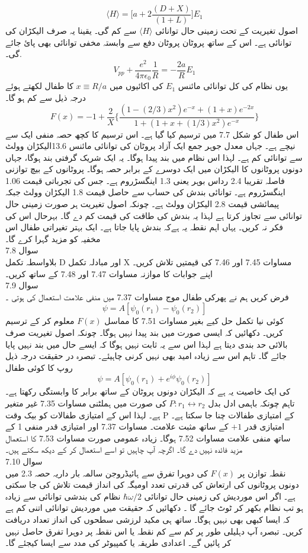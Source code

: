 \[\langle H \rangle =\big[a+2\frac{(D+X)}{(1+L)}\big]E_{1}\]
اصول تغیریت کے تحت زمینی حال توانائی  
\(\langle H \rangle\)
 سے کم گی۔ یقینا  یہ صرف الیکڑان کی توانائی ہے۔ اس کے ساتھ پروٹان پروٹان دفع سے وابستہ مخفی توانائی بھی پائ جائے گی۔.
\[V_{pp}+\frac{e^{2}}{4\pi\epsilon_{0}}\frac{1}{R}=-\frac{2a}{R}E_{1}\]
یوں نظام کی  کل توانائی مائنس
\(E_{1}\)
  کی  اکائیوں میں 
  \(x\equiv R/a\)
  کا طفال لکھتے ہوئے درجہ ذیل سے کم ہو گا۔
  \[F(x)=-1+\frac{2}{X}\big\{\frac{(1-(2/3)x^{2})e^{-x}+(1+x)e^{-2x}}{1+(1+x+(1/3)x^{2})e^{-x}}\big\}\]
اس طفال کو شکل 7.7 میں ترسیم کیا گیا ہے۔ اس ترسیم کا کچھ حصہ منفی ایک سے نیچے ہے۔ جہاں معدل جوہر جمع ایک آزاد پروٹان کی توانائی مائنس  13.6الیکڑان وولٹ سے توانائی کم ہے۔ لہذا اس نظام میں بند پیدا ہوگا۔ یہ ایک شریک گرفتی بند ہوگا، جہاں دونوں پروٹانوں کا الیکڑان میں ایک دوسرے کے برابر حصہ ہوگا۔ پروٹانوں کے بیچ توازنی فاصلہ تقریبا 2.4 رداس بوہر یعنی 1.3 اینگسڑروم ہے۔ جس کی تجرباتی قیمت 1.06 اینگسڑروم ہے۔ توانائی بندش کی حساب سے حاصل قیمت 1.8 الیکڑان وولٹ جبکہ پیمائشی قیمت 2.8 الیکڑان وولٹ ہے۔ چونکہ اصول تغیریت ہر صورت زمینی حال توانائی سے تجاوز کرتا ہے لہذا یہ بندش کی طاقت کی قیمت کم دے گا۔ بہرحال اس کی فکر نہ کریں۔ یہاں اہم نقطہ یہ ہےکہ بندش پایا جاتا ہے۔ ایک بہتر تغیراتی طفال اس مخفیہ کو مزید گہرا کرے گا۔ \\
سوال 
7.8\\
بلاواسطہ تکمل D اور مبادلہ تکمل X مساوات 7.45 اور 7.46 کی قیمتیں تلاش کریں۔ اپنے جوابات کا موازنہ مساوات 7.47 اور 7.48 کے ساتھ کریں۔ \\
سوال 
7.9\\
فرض کریں ہم نے پھرکی طفال موج مساوات 7.37 میں منفی علامت استعمال کی ہوتی ۔
\[\psi=A[\psi_{0}(r_{1})-\psi_{0}(r_{2})]\]
کوئی نیا تکمل حل کیے بغیر مساوات  7.51 کا مماسل
\( F(x)\) 
معلوم کر کے ترسیم کریں۔ دکھائیں کہ ایسی صورت میں بند پیدا نہیں ہوگا۔ چونکہ اصول تغیریت صرف بالائی حد بندی دیتا ہے لہذا اس سے یہ ثابت نہیں ہوگا کہ ایسے حال میں بند نہیں پایا جائے گا۔ تاہم اس سے زیادہ امید بھی نہیں کرنی چاہیئے۔ تبصرہ در حقیقت درجہ ذیل روپ کا کوئی طفال 
\[\psi=A[\psi_{0}(r_{1})+e^{i\phi}\psi_{0}(r_{2})]\]
کی ایک خاصیت یہ ہے کہ  الیکڑان دونوں پروٹان کے ساتھ برابر کا وابستگی رکھتا ہے۔ تاہم چونکہ باہمی ادل بدل 
\(P: r_{1}\leftrightarrow r_{2}\)
کی صورت میں ہملٹنی مساوات 7.35 غیر متغیر ہے۔ لہذا اس کے امتیازی طفالات کو بیک وقت P کے امتیازی طفالات چنا جا سکتا ہے۔ امتیازی قدر
\(+1\)
کے ساتھ مثبت علامت۔ مساوات 7.37 اور امتیازی قدر منفی 1 کے ساتھ منفی علامت مساوات 7.52 ہوگا۔ زیادہ عمومی صورت مساوات 7.53 کا استعمال مزید فائدہ نہیں دے گا۔ اگرچہ آپ چاہیں تو اسے استعمال کر کے دیکھ سکتے ہیں۔\\
سوال 
7.10\\
نقطہ توازن پر
\( F(x)\)
 کی دوہرا تفرق سے ہائیڈروجن سالمہ بار داریہ حصہ 2.3 میں دونوں پروٹانوں کی ارتعاش کی قدرتی تعدد اومیگہ کی انداز قیمت تلاش کی جا سکتی ہے۔ اگر اس موردیش کی زمینی حال توانائی 
 \(\hbar\omega/2\)
 نظام کی بندشی توانائی سے زیادہ ہو تب نظام بکھر کر ٹوٹ جائے گا ۔ دکھائیں کہ حقیقت میں موردیش توانائی اتنی کم ہے کہ ایسا کبھی بھی نہیں ہوگا۔ ساتھ ہی مکید لرزشی سطحوں کی انداز  تعداد دریافت کریں۔ تبصرہ 
آپ دہلیلی طور پر کم سے کم نقطہ یا اس نقطہ پر دوہرا تفرق حاصل نہیں کر پائیں گے۔ اعدادی طریقہ یا کمپیوٹر کی مدد سے  ایسا کیجئے گا۔\\




